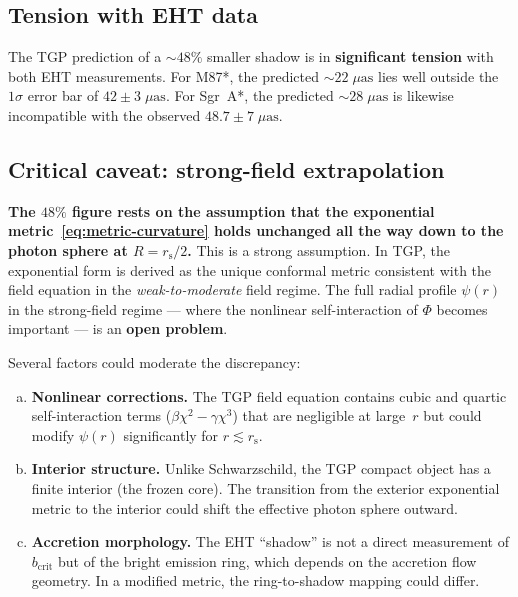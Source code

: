 \documentclass[11pt,a4paper]{article}
\theoremstyle{definition}
\theoremstyle{remark}
\newcommand{\rs}{r_{\mathrm{s}}}
\newcommand{\bcrit}{b_{\mathrm{crit}}}
\renewcommand{\Phi}{\varPhi}
\begin{document}
\subsection{Tension with EHT data}

The TGP prediction of a $\sim 48\%$ smaller shadow is in
\textbf{significant tension} with both EHT measurements.  For M87*, the
predicted $\sim 22\;\mu\mathrm{as}$ lies well outside the $1\sigma$
error bar of $42 \pm 3\;\mu\mathrm{as}$.  For Sgr~A*, the predicted
$\sim 28\;\mu\mathrm{as}$ is likewise incompatible with the observed
$48.7 \pm 7\;\mu\mathrm{as}$.

\subsection{Critical caveat: strong-field extrapolation}
\label{ssec:caveat}

\textbf{The $48\%$ figure rests on the assumption that the exponential
metric~\eqref{eq:metric-curvature} holds unchanged all the way down to
the photon sphere at $R = \rs/2$.}  This is a strong assumption.  In TGP, the exponential form is
derived as the unique conformal metric consistent with the field equation
in the \emph{weak-to-moderate} field regime.  The full radial profile
$\psi(r)$ in the strong-field regime --- where the nonlinear
self-interaction of $\Phi$ becomes important --- is an \textbf{open
problem}.

Several factors could moderate the discrepancy:
\begin{enumerate}[(a)]
\item \textbf{Nonlinear corrections.}\quad
  The TGP field equation contains cubic and quartic self-interaction
  terms ($\beta\chi^2 - \gamma\chi^3$) that are negligible at large~$r$
  but could modify $\psi(r)$ significantly for $r \lesssim \rs$.

\item \textbf{Interior structure.}\quad
  Unlike Schwarzschild, the TGP compact object has a finite interior
  (the frozen core).  The transition from the exterior exponential
  metric to the interior could shift the effective photon sphere
  outward.

\item \textbf{Accretion morphology.}\quad
  The EHT ``shadow'' is not a direct measurement of $\bcrit$ but of
  the bright emission ring, which depends on the accretion flow
  geometry.  In a modified metric, the ring-to-shadow mapping could
  differ.
\end{enumerate}
\end{document}
